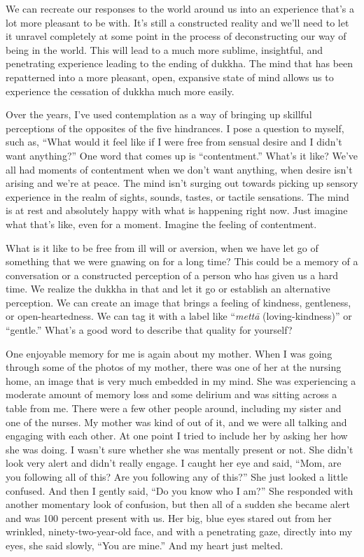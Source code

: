 We can recreate our responses to the world around us into an experience that's a lot more pleasant to be with. It's still a constructed reality and we'll need to let it unravel completely at some point in the process of deconstructing our way of being in the world. This will lead to a much more sublime, insightful, and penetrating experience leading to the ending of dukkha. The mind that has been repatterned into a more pleasant, open, expansive state of mind allows us to experience the cessation of dukkha much more easily.

Over the years, I've used contemplation as a way of bringing up skillful perceptions of the opposites of the five hindrances. I pose a question to myself, such as, ``What would it feel like if I were free from sensual desire and I didn't want anything?'' One word that comes up is ``contentment.'' What's it like? We've all had moments of contentment when we don't want anything, when desire isn't arising and we're at peace. The mind isn't surging out towards picking up sensory experience in the realm of sights, sounds, tastes, or tactile sensations. The mind is at rest and absolutely happy with what is happening right now. Just imagine what that's like, even for a moment. Imagine the feeling of contentment.

\enlargethispage{1\baselineskip}
What is it like to be free from ill will or aversion, when we have let go of something that we were gnawing on for a long time? This could be a memory of a conversation or a constructed perception of a person who has given us a hard time. We realize the dukkha in that and let it go or establish an alternative perception. We can create an image that brings a feeling of kindness, gentleness, or open-heartedness. We can tag it with a label like ``\emph{mettā} (loving-kindness)'' or ``gentle.'' What's a good word to describe that quality for yourself?

One enjoyable memory for me is again about my mother. When I was going through some of the photos of my \linebreak mother, there was one of her at the nursing home, an image that is very much embedded in my mind. She was experiencing a moderate amount of memory loss and some delirium and was sitting across a table from me. There were a few other people around, including my sister and one of the nurses. My mother was kind of out of it, and we were all talking and engaging with each other. At one point I tried to include her by asking her how she was doing. I wasn't sure whether she was mentally present or not. She didn't look very alert and didn't really engage. I caught her eye and said, ``Mom, are you following all of this? Are you following any of this?'' She just looked a little confused. And then I gently said, ``Do you know who I am?'' She responded with another momentary look of confusion, but then all of a sudden she became alert and was 100 percent present with us. Her big, blue eyes stared out from her wrinkled, ninety-two-year-old face, and with a penetrating gaze, directly into my eyes, she said slowly, ``You are mine.'' And my heart just melted.

